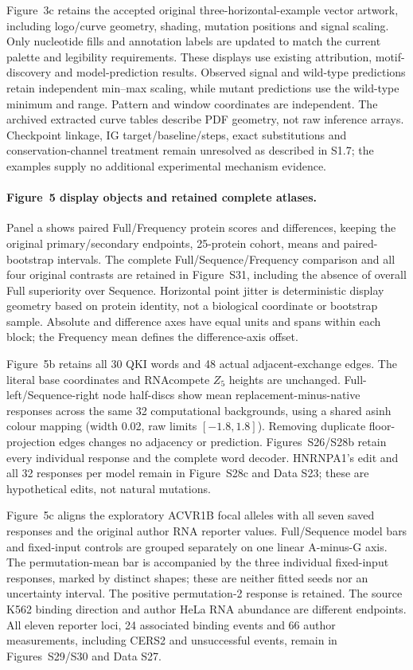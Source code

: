 \documentclass[11pt]{article}
\begin{document}
Figure~3c retains the accepted original three-horizontal-example vector artwork, including logo/curve geometry, shading, mutation positions and signal scaling. Only nucleotide fills and annotation labels are updated to match the current palette and legibility requirements. These displays use existing attribution, motif-discovery and model-prediction results. Observed signal and wild-type predictions retain independent min--max scaling, while mutant predictions use the wild-type minimum and range. Pattern and window coordinates are independent. The archived extracted curve tables describe PDF geometry, not raw inference arrays. Checkpoint linkage, IG target/baseline/steps, exact substitutions and conservation-channel treatment remain unresolved as described in S1.7; the examples supply no additional experimental mechanism evidence.




\paragraph{Figure~5 display objects and retained complete atlases.} Panel a shows paired Full/Frequency protein scores and differences, keeping the original primary/secondary endpoints, 25-protein cohort, means and paired-bootstrap intervals. The complete Full/Sequence/Frequency comparison and all four original contrasts are retained in Figure~S31, including the absence of overall Full superiority over Sequence. Horizontal point jitter is deterministic display geometry based on protein identity, not a biological coordinate or bootstrap sample. Absolute and difference axes have equal units and spans within each block; the Frequency mean defines the difference-axis offset.

Figure~5b retains all 30 QKI words and 48 actual adjacent-exchange edges. The literal base coordinates and RNAcompete $Z_5$ heights are unchanged. Full-left/Sequence-right node half-discs show mean replacement-minus-native responses across the same 32 computational backgrounds, using a shared asinh colour mapping (width 0.02, raw limits $[-1.8,1.8]$). Removing duplicate floor-projection edges changes no adjacency or prediction. Figures~S26/S28b retain every individual response and the complete word decoder. HNRNPA1's edit and all 32 responses per model remain in Figure~S28c and Data S23; these are hypothetical edits, not natural mutations.

Figure~5c aligns the exploratory ACVR1B focal alleles with all seven saved responses and the original author RNA reporter values. Full/Sequence model bars and fixed-input controls are grouped separately on one linear A-minus-G axis. The permutation-mean bar is accompanied by the three individual fixed-input responses, marked by distinct shapes; these are neither fitted seeds nor an uncertainty interval. The positive permutation-2 response is retained. The source K562 binding direction and author HeLa RNA abundance are different endpoints. All eleven reporter loci, 24 associated binding events and 66 author measurements, including CERS2 and unsuccessful events, remain in Figures~S29/S30 and Data S27.
\end{document}
